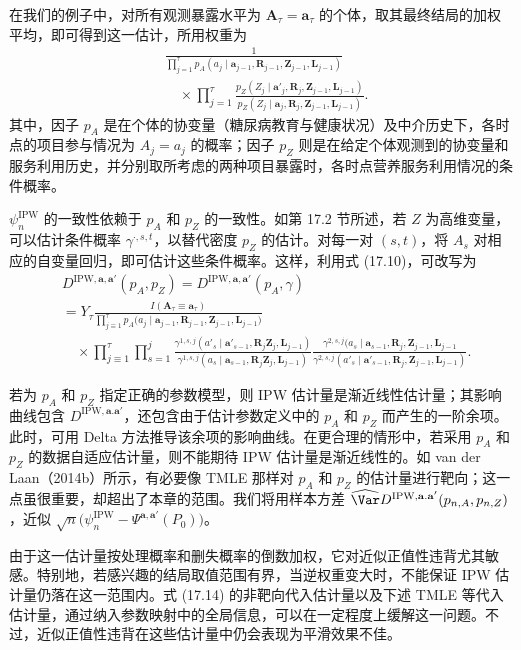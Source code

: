 在我们的例子中，对所有观测暴露水平为 $\mathbf A_\tau=\mathbf a_\tau$ 的个体，取其最终结局的加权平均，即可得到这一估计，所用权重为
\[
\begin{aligned}
 &\frac1{\prod_{j=1}^\tau p_A(a_j\mid\mathbf a_{j-1},\mathbf R_{j-1},\mathbf Z_{j-1},\mathbf L_{j-1})}\\
 &\quad{}\times\prod_{j=1}^\tau
 \frac{p_Z(Z_j\mid\mathbf a'_j,\mathbf R_j,\mathbf Z_{j-1},\mathbf L_{j-1})}
 {p_Z(Z_j\mid\mathbf a_j,\mathbf R_j,\mathbf Z_{j-1},\mathbf L_{j-1})}.
\end{aligned}
\]
其中，因子 $p_A$ 是在个体的协变量（糖尿病教育与健康状况）及中介历史下，各时点的项目参与情况为 $A_j=a_j$ 的概率；因子 $p_Z$ 则是在给定个体观测到的协变量和服务利用历史，并分别取所考虑的两种项目暴露时，各时点营养服务利用情况的条件概率。

$\psi_n^{\mathrm{IPW}}$ 的一致性依赖于 $p_A$ 和 $p_Z$ 的一致性。如第 17.2 节所述，若 $Z$ 为高维变量，可以估计条件概率 $\gamma^{\cdot,s,t}$，以替代密度 $p_Z$ 的估计。对每一对 $(s,t)$，将 $A_s$ 对相应的自变量回归，即可估计这些条件概率。这样，利用式 (17.10)，可改写为
\begin{equation}
\begin{aligned}
 &D^{\mathrm{IPW},\mathbf a,\mathbf a'}(p_A,p_Z)
 =D^{\mathrm{IPW},\mathbf a,\mathbf a'}(p_A,\gamma)\\
 &=Y_\tau\frac{I(\mathbf A_\tau\equiv\mathbf a_\tau)}
 {\prod_{j\equiv1}^\tau p_A\bigl(a_j\mid\mathbf a_{j-1},\mathbf R_{j-1},\mathbf Z_{j-1},\mathbf L_{j-1}\bigr)}\\
 &\quad{}\times\prod_{j\equiv1}^\tau\prod_{s=1}^j
 \frac{\gamma^{1,s,j}(a'_s\mid\mathbf a'_{s-1},\mathbf R_j\mathbf Z_j,\mathbf L_{j-1})}
 {\gamma^{1,s,j}(a_s\mid\mathbf a_{s-1},\mathbf R_j\mathbf Z_j,\mathbf L_{j-1})}
 \frac{\gamma^{2,s,j}(a_s\mid\mathbf a_{s-1},\mathbf R_j,\mathbf Z_{j-1},\mathbf L_{j-1}}
 {\gamma^{2,s,j}(a'_s\mid\mathbf a'_{s-1},\mathbf R_j,\mathbf Z_{j-1},\mathbf L_{j-1})}.
\end{aligned}
\tag{17.17}
\end{equation}

若为 $p_A$ 和 $p_Z$ 指定正确的参数模型，则 IPW 估计量是渐近线性估计量；其影响曲线包含 $D^{\mathrm{IPW},\mathbf a.\mathbf a'}$，还包含由于估计参数定义中的 $p_A$ 和 $p_Z$ 而产生的一阶余项。此时，可用 Delta 方法推导该余项的影响曲线。在更合理的情形中，若采用 $p_A$ 和 $p_Z$ 的数据自适应估计量，则不能期待 IPW 估计量是渐近线性的。如 van der Laan（2014b）所示，有必要像 TMLE 那样对 $p_A$ 和 $p_Z$ 的估计量进行靶向；这一点虽很重要，却超出了本章的范围。我们将用样本方差 $\widehat{\Var}D^{\mathrm{IPW},\mathbf a.\mathbf a'}(p_{n,A},p_{n,Z})$，近似 $\sqrt n\bigl(\psi_n^{\mathrm{IPW}}-\Psi^{\mathbf a,\mathbf a'}(P_0)\bigr)$。

由于这一估计量按处理概率和删失概率的倒数加权，它对近似正值性违背尤其敏感。特别地，若感兴趣的结局取值范围有界，当逆权重变大时，不能保证 IPW 估计量仍落在这一范围内。式 (17.14) 的非靶向代入估计量以及下述 TMLE 等代入估计量，通过纳入参数映射中的全局信息，可以在一定程度上缓解这一问题。不过，近似正值性违背在这些估计量中仍会表现为平滑效果不佳。
